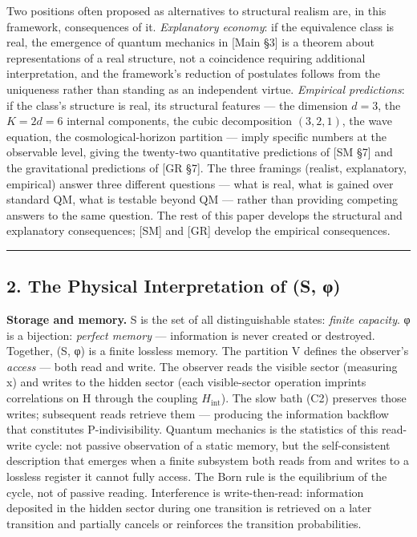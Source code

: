 \documentclass[
]{article}
\begin{document}
Two positions often proposed as alternatives to structural realism are,
in this framework, consequences of it. \emph{Explanatory economy}: if
the equivalence class is real, the emergence of quantum mechanics in
{[}Main §3{]} is a theorem about representations of a real structure,
not a coincidence requiring additional interpretation, and the
framework's reduction of postulates follows from the uniqueness rather
than standing as an independent virtue. \emph{Empirical predictions}: if
the class's structure is real, its structural features --- the dimension
\(d = 3\), the \(K = 2d = 6\) internal components, the cubic
decomposition \((3, 2, 1)\), the wave equation, the cosmological-horizon
partition --- imply specific numbers at the observable level, giving the
twenty-two quantitative predictions of {[}SM §7{]} and the gravitational
predictions of {[}GR §7{]}. The three framings (realist, explanatory,
empirical) answer three different questions --- what is real, what is
gained over standard QM, what is testable beyond QM --- rather than
providing competing answers to the same question. The rest of this paper
develops the structural and explanatory consequences; {[}SM{]} and
{[}GR{]} develop the empirical consequences.

\begin{center}\rule{0.5\linewidth}{0.5pt}\end{center}

\hypertarget{the-physical-interpretation-of-s-ux3c6}{%
\subsection{2. The Physical Interpretation of (S,
φ)}\label{the-physical-interpretation-of-s-ux3c6}}

\textbf{Storage and memory.} S is the set of all distinguishable states:
\emph{finite capacity}. φ is a bijection: \emph{perfect memory} ---
information is never created or destroyed. Together, (S, φ) is a finite
lossless memory. The partition V defines the observer's \emph{access}
--- both read and write. The observer reads the visible sector
(measuring x) and writes to the hidden sector (each visible-sector
operation imprints correlations on H through the coupling
\(H_{\text{int}}\)). The slow bath (C2) preserves those writes;
subsequent reads retrieve them --- producing the information backflow
that constitutes P-indivisibility. Quantum mechanics is the statistics
of this read-write cycle: not passive observation of a static memory,
but the self-consistent description that emerges when a finite subsystem
both reads from and writes to a lossless register it cannot fully
access. The Born rule is the equilibrium of the cycle, not of passive
reading. Interference is write-then-read: information deposited in the
hidden sector during one transition is retrieved on a later transition
and partially cancels or reinforces the transition probabilities.
\end{document}
